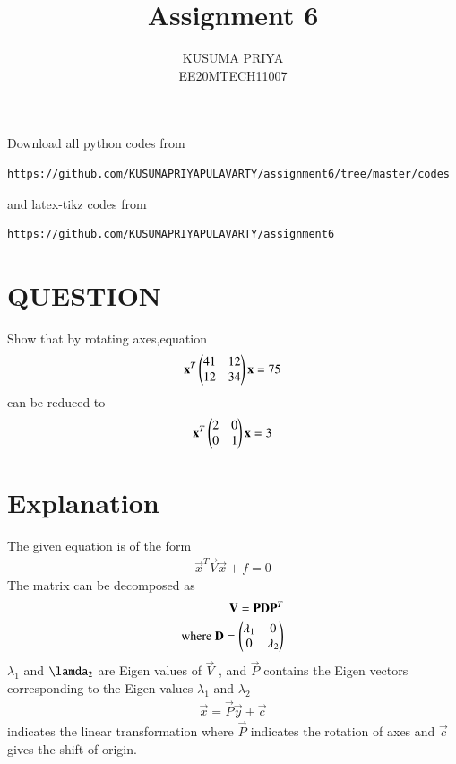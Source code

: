 \documentclass[journal,12pt,twocolumn]{IEEEtran}
\begin{document}
\renewcommand{\thefigure}{\theproblem}

\def\putbox#1#2#3{\makebox[0in][l]{\makebox[#1][l]{}\raisebox{\baselineskip}[0in][0in]{\raisebox{#2}[0in][0in]{#3}}}}
     \def\rightbox#1{\makebox[0in][r]{#1}}
     \def\centbox#1{\makebox[0in]{#1}}
     \def\topbox#1{\raisebox{-\baselineskip}[0in][0in]{#1}}
     \def\midbox#1{\raisebox{-0.5\baselineskip}[0in][0in]{#1}}
\vspace{3cm}
\title{Assignment 6}
\author{KUSUMA PRIYA\\EE20MTECH11007}

\maketitle
\newpage

\bigskip
\renewcommand{\thefigure}{\theenumi}
\renewcommand{\thetable}{\theenumi}
Download all python codes from 
\begin{lstlisting}
https://github.com/KUSUMAPRIYAPULAVARTY/assignment6/tree/master/codes
\end{lstlisting}
%
and latex-tikz codes from 
%
\begin{lstlisting}
https://github.com/KUSUMAPRIYAPULAVARTY/assignment6
\end{lstlisting}
%
 
 \section{QUESTION}
Show that by rotating axes,equation
\begin{align}
 \mathbf{x}^T\begin{pmatrix}41&12\\12&34\end{pmatrix}\mathbf{x}=75\label{1}
\end{align}
can be reduced to
\begin{align}
 \mathbf{x}^T\begin{pmatrix}2&0\\0&1\end{pmatrix}\mathbf{x}=3
\end{align}
%
\section {Explanation}
The given equation is of the form
\begin{align}
   \vec{x}^T\vec{V}\vec{x}+f=0
\end{align}
The matrix  can be decomposed as
\begin{align}
    \mathbf{V}=\mathbf{P}\mathbf{D}\mathbf{P}^T\label{2}\\
    \text{where  }\mathbf{D}=\begin{pmatrix}\lambda_1&0\\0&\lambda_2\end{pmatrix}
\end{align}
$\lambda_1$ and $\lamda_2$ are Eigen values of $\vec{V}$ , and
$\vec{P}$ contains the Eigen vectors corresponding to the Eigen values $\lambda_1$ and $\lambda_2$
\begin{align}
\vec{x}=\vec{P}\vec{y}+\vec{c}
\end{align}
indicates the linear transformation where $\vec{P}$ indicates the rotation of axes and $\vec{c}$ gives the shift of origin.
\end{document}
